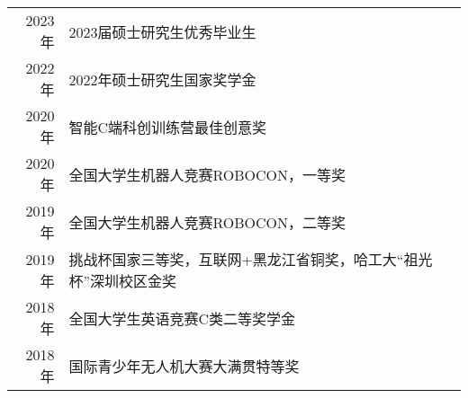 %
%




\begin{tabular}{rl}	
	2023年 & 2023届硕士研究生优秀毕业生\\
	2022年 & 2022年硕士研究生国家奖学金 \\
	2020年 & 智能C端科创训练营最佳创意奖\\
	2020年 & 全国大学生机器人竞赛ROBOCON，一等奖\\
	2019年 & 全国大学生机器人竞赛ROBOCON，二等奖\\
	2019年 & 挑战杯国家三等奖，互联网+黑龙江省铜奖，哈工大“祖光杯”深圳校区金奖\\
	2018年 & 全国大学生英语竞赛C类二等奖学金\\
	2018年 & 国际青少年无人机大赛大满贯特等奖
\end{tabular}

